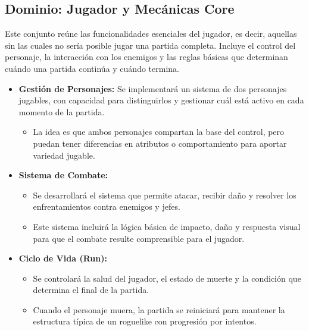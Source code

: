 \subsection{Dominio: Jugador y Mecánicas Core}
Este conjunto reúne las funcionalidades esenciales del jugador, es decir, aquellas 
sin las cuales no sería posible jugar una partida completa. Incluye el control del 
personaje, la interacción con los enemigos y las reglas básicas que determinan cuándo 
una partida continúa y cuándo termina.
\begin{itemize}
    \item \textbf{Gestión de Personajes:} Se implementará un sistema de dos personajes 
    jugables, con capacidad para distinguirlos y gestionar cuál está activo en cada 
    momento de la partida.
    \begin{itemize}
        \item La idea es que ambos personajes compartan la base del control, pero puedan 
        tener diferencias en atributos o comportamiento para aportar variedad jugable.
    \end{itemize}
    \item \textbf{Sistema de Combate:}
    \begin{itemize}
        \item Se desarrollará el sistema que permite atacar, recibir daño y resolver los 
        enfrentamientos contra enemigos y jefes.
        \item Este sistema incluirá la lógica básica de impacto, daño y respuesta visual 
        para que el combate resulte comprensible para el jugador.
    \end{itemize}
    \item \textbf{Ciclo de Vida (Run):}
    \begin{itemize}
        \item Se controlará la salud del jugador, el estado de muerte y la condición que 
        determina el final de la partida.
        \item Cuando el personaje muera, la partida se reiniciará para mantener la 
        estructura típica de un roguelike con progresión por intentos.
    \end{itemize}
\end{itemize}

